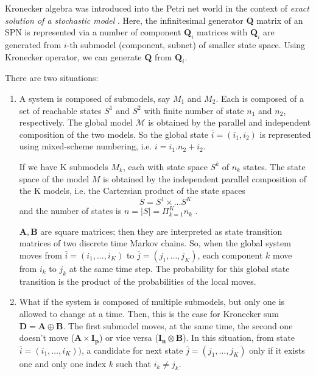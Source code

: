 Kronecker algebra was introduced into the Petri net world in the context of {\it
exact solution of a stochastic model} \citep{donatelli2001}. Here, the
infinitesimal generator {\bf Q} matrix of an SPN is represented via a number of
component $\mathbf{Q}_i$ matrices with $\mathbf{Q}_i$ are generated from $i$-th
submodel (component, subnet) of smaller state space. Using Kronecker operator,
we can generate $\mathbf{Q}$ from $\mathbf{Q}_i$.

There are two situations: 
\begin{enumerate}
  \item  A system is composed of submodels, say $M_1$ and $M_2$. Each is composed
  of a set of reachable states $S^1$ and $S^2$ with finite number of state $n_1$
  and $n_2$, respectively. The global model $\mathcal{M}$ is obtained by the parallel and
  independent composition of the two models. So the global state
  $\overline{i}=(i_1,i_2)$ is represented using mixed-scheme numbering, i.e. 
  $i=i_1.n_2 + i_2$. 
  
If we have K submodels $M_k$, each with state space $S^k$ of $n_k$ states. The
state space of the model $M$ is obtained by the independent parallel composition
of the K models, i.e. the Cartersian product of the state spaces
\begin{equation}
S = S^1 \times \ldots S^K
\end{equation}
and the number of states is $n = |S| = \Pi_{k=1}^K n_k$ \citep{donatelli2001}.
 
$\mathbf{A}, \mathbf{B}$ are square matrices; then they are interpreted
  as state transition matrices of two discrete time Markov chains. So, when the
  global system moves from $\overline{i}=(i_1,\ldots,i_K)$ to
  $\overline{j}=(j_1,\ldots,j_K)$, each component $k$ move from $i_k$ to $j_k$
  at the same time step. The probability for this global state transition is the
  product of the probabilities of the local moves. 
  
    \item What if the system is composed of multiple submodels, but only one is
    allowed to change at a time. Then, this is the case for Kronecker sum
    $\mathbf{D = A \oplus B}$. The first submodel moves, at the same time, the
    second one doesn't move ($\mathbf{A\times I_p}$) or vice versa ($\mathbf{I_n
    \otimes B}$). In this situation, from state $\overline{i} = (i_1,\ldots,
    i_K))$, a candidate for next state $\overline{j} = (j_1,\ldots,j_K)$ only if
    it exists one and only one index $k$ such that $i_k \ne j_k$. 
    
\end{enumerate}

